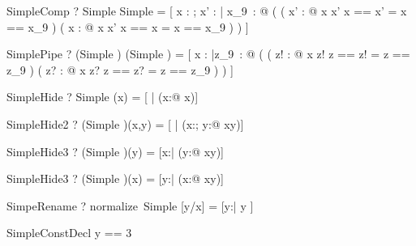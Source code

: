 \begin{theorem}{SimpleComp}
  \vdash? \Delta Simple \semi \Delta Simple =
	  [ x : \arithmos ; x' : \arithmos
		|
		  \exists x_{9}~: \arithmos @
			  ( ( \exists x' : \arithmos @
				      x \in \nat \land x' \in \nat  \land \lblot x == x' \rblot = \lblot x == x_{9} \rblot )
					\land
					( \exists x : \arithmos @
					    x \in \nat \land x' \in \nat \land \lblot x == x \rblot = \lblot x == x_{9} \rblot )  ) ]
\end{theorem}

\begin{theorem}{SimplePipe}
  \vdash? (Simple \land [z!:\nat]) \pipe (Simple \land [z?:\nat]) =
	  [ x : \arithmos
		|\exists z_{9}~: \arithmos @
		   ( ( \exists z! : \arithmos @
			         x \in \nat \land z! \in \nat \land \lblot z == z! \rblot = \lblot z == z_{9} \rblot )
				 \land
				 ( \exists z? : \arithmos @
				       x \in \nat \land z? \in \nat \land \lblot z == z? \rblot = \lblot z == z_{9} \rblot ) ) ]
\end{theorem}

\begin{theorem}{SimpleHide}
  \vdash? Simple \hide (x) = [ | (\exists x:\arithmos @ x\in\nat)]
\end{theorem}

\begin{theorem}{SimpleHide2}
  \vdash? (Simple )\hide(x,y) =
                [ | (\exists x:\arithmos; y:\arithmos @ x\in\nat \land y\in\nat)]
\end{theorem}

\begin{theorem}{SimpleHide3}
  \vdash? (Simple )\hide(y) =
          [x:\arithmos | (\exists y:\arithmos @ x\in\nat \land y\in\nat)]
\end{theorem}

\begin{theorem}{SimpleHide3}
  \vdash? (Simple )\hide(x) =
          [y:\arithmos | (\exists x:\arithmos @ x\in\nat \land y\in\nat)]
\end{theorem}

\begin{theorem}{SimpeRename}
  \vdash? normalize~Simple [y/x] = [y:\arithmos | y \in \nat]
\end{theorem}

\begin{schema}{SimpleConstDecl}
  y == 3
\end{schema}

